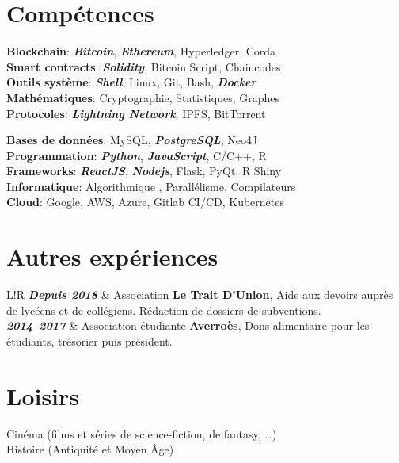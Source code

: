 \documentclass[10pt]{article}
\newcommand\VRule{\color{lightgray}\vrule width 2pt}
\begin{document}
\section*{Compétences}
\hspace*{1ex}
\begin{minipage}[ht]{0.50\textwidth}
\textbf{Blockchain}: \textbf{\textit{Bitcoin}}, \textbf{\textit{Ethereum}}, Hyperledger, Corda \\[0.1cm]
\textbf{Smart contracts}: \textbf{\textit{Solidity}}, Bitcoin Script, Chaincodes \\[0.1cm]
\textbf{Outils système}: \textbf{\textit{Shell}}, Linux, Git, Bash, \textbf{\textit{Docker}} \\[0.1cm] 
\textbf{Mathématiques}: Cryptographie, Statistiques, Graphes \\[0.1cm]
\textbf{Protocoles}: \textbf{\textit{Lightning Network}}, IPFS, BitTorrent \\
\end{minipage}
\begin{minipage}[ht]{0.50\textwidth}
\textbf{Bases de données}: MySQL, \textbf{\textit{PostgreSQL}}, Neo4J \\[0.1cm]
\textbf{Programmation}: \textbf{\textit{Python}}, \textbf{\textit{JavaScript}}, C/C++, R \\[0.1cm]
\textbf{Frameworks}: \textbf{\textit{ReactJS}}, \textbf{\textit{Nodejs}}, Flask, PyQt, R Shiny \\[0.1cm]
\textbf{Informatique}: Algorithmique , Parallélisme, Compilateurs \\[0.1cm]
\textbf{Cloud}: Google, AWS, Azure, Gitlab CI/CD, Kubernetes \\
\end{minipage}
\vspace{-5ex}
\section*{Autres expériences}
\begin{tabular}{L!{\VRule}R}
\textbf{\textit{Depuis 2018}} & Association \textbf{Le Trait D’Union}, Aide aux devoirs auprès de lycéens et de collégiens. Rédaction de dossiers de subventions. \\[0.75cm]

\textbf{\textit{2014--2017}} & Association étudiante \textbf{Averroès}, Dons alimentaire pour les étudiants, trésorier puis président. \\
\end{tabular}
\section*{Loisirs}
\hspace*{1ex} Cinéma (films et séries de science-fiction, de fantasy, …) \\
\hspace*{1ex} Histoire (Antiquité et Moyen Âge) \\
\end{document}
